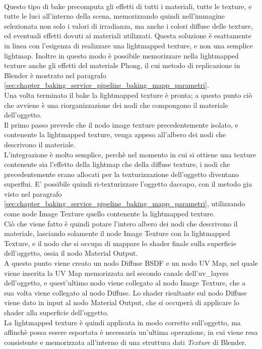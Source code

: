 \\
Questo tipo di bake precomputa gli effetti di tutti i materiali, tutte le texture, e tutte le luci all’interno della scena, memorizzando quindi nell’immagine selezionata non solo i valori di irradianza, ma anche i colori diffuse delle texture, ed eventuali effetti dovuti ai materiali utilizzati. Questa soluzione è esattamente in linea con l’esigenza di realizzare una lightmapped texture, e non una semplice lightmap. Inoltre in questo modo è possibile memorizzare nella lightmapped texture anche gli effetti del materiale Phong, il cui metodo di replicazione in Blender è mostrato nel paragrafo \ref{sec:chapter_baking_service_pipeline_baking_mapp_parametri}. 
\\
Una volta terminato il bake la lightmapped texture è pronta; a questo punto ciò che avviene è una riorganizzazione dei nodi che compongono il materiale dell’oggetto.
\\ 
Il primo passo prevede che il nodo image texture precedentemente isolato, e contenente la lightmapped texture, venga appeso all’albero dei nodi che descrivono il materiale. 
\\
L’integrazione è molto semplice, perchè nel momento in cui si ottiene una texture contenente sia l’effetto della lightmap che della diffuse texture, i nodi che precedentemente erano allocati per la texturizzazione dell’oggetto diventano superflui. E’ possibile quindi ri-texturizzare l’oggetto daccapo, con il metodo gia visto nel paragrafo \ref{sec:chapter_baking_service_pipeline_baking_mapp_parametri}, utilizzando come node Image Texture quello contenente la lightmapped texture.
\\ 
Ciò che viene fatto è quindi potare l’intero albero dei nodi che descrivono il materiale, lasciando solamente il node Image Texture con la lightmapped Texture, e il nodo che si occupa di mappare lo shader finale sulla superficie dell’oggetto, ossia il nodo Material Output. 
\\
A questo punto viene creato un nodo Diffuse BSDF e un nodo UV Map, nel quale viene inserita la UV Map memorizzata nel secondo canale dell’uv\_layers dell’oggetto, e quest’ultimo nodo viene collegato al nodo Image Texture, che a sua volta viene collegato al nodo Diffuse. Lo shader risultante sul nodo Diffuse viene dato in input al nodo Material Output, che si occuperà di applicare lo shader alla superficie dell’oggetto. 
\\
La lightmapped texture è quindi applicata in modo corretto sull’oggetto, ma affinchè possa essere esportata è necessaria un'ultima operazione, in cui viene resa consistente e memorizzata all’interno di una struttura dati \emph{Texture} di Blender. 
